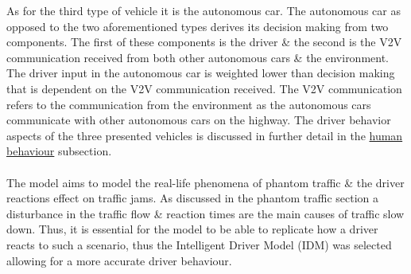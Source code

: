 As for the third type of vehicle it is the autonomous car. The autonomous car as opposed to the two aforementioned types derives its decision making from two components. The first of these components is the driver \& the second is the V2V communication received from both other autonomous cars \& the environment. The driver input in the autonomous car is weighted lower than decision making that is dependent on the V2V communication received. The V2V communication refers to the communication from the environment as the autonomous cars communicate  with other autonomous cars on the highway. The driver behavior aspects of the three presented vehicles is discussed in further detail in the \hyperref[HumanBehaviour]{human behaviour} subsection.\\ 
\\
The model aims to model the real-life phenomena of phantom traffic \& the driver reactions effect on traffic jams. As discussed in the phantom traffic section a disturbance in the traffic flow \& reaction times are the main causes of traffic slow down. Thus, it is essential for the model to be able to replicate how a driver reacts to such a scenario, thus the Intelligent Driver Model (IDM) was selected allowing for a more accurate driver behaviour. \cite{CaoIDM}
% 




 




